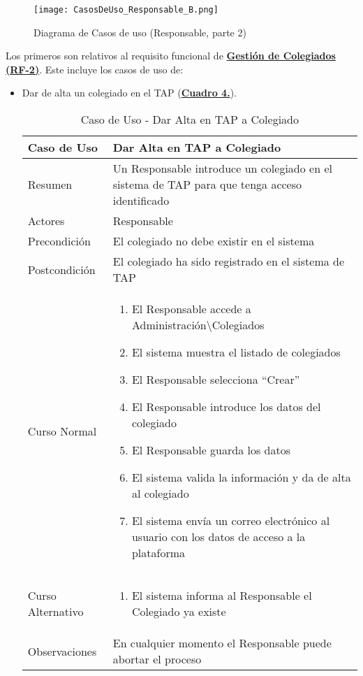 \begin{figure}[!htbp]
  \centering
  \texttt{[image: CasosDeUso\_Responsable\_B.png]}
  \caption{Diagrama de Casos de uso (Responsable, parte 2)}
  \label{fig:CasosDeUso_Responsable_B}
\end{figure}
\FloatBarrier


Los primeros son relativos al requisito funcional de \textbf{\hyperref[tab:rfGestColeg]{Gestión de Colegiados (RF-2)}}. Este incluye los casos de uso de:
\begin{itemize}
	\item \addtocounter{tabla}{1} Dar de alta un colegiado en el TAP (\textbf{\hyperref[tab:curColegAlta]{Cuadro 4.}}).
		\begin{table}[!htbp]
		  \centering  \addtocounter{casouso}{1}
		  \begin{tabular}{|l | p{100mm}|}
		    \textbf{Caso de Uso}  & \textbf{Dar Alta en TAP a Colegiado} \\ \hline
		    Resumen 		 & Un Responsable introduce un colegiado en el sistema de TAP para que tenga acceso identificado \\ \hline
		    Actores  		 & Responsable \\ \hline
		    Precondición  	 & El colegiado no debe existir en el sistema  \\ \hline
		    Postcondición  	 & El colegiado ha sido registrado en el sistema de TAP \\ \hline
		    Curso Normal   	 & \begin{enumerate}
			  \item El Responsable accede a Administración\textbackslash Colegiados
			  \item El sistema muestra el listado de colegiados
			  \item El Responsable selecciona ``Crear''
			  \item El Responsable introduce los datos del colegiado
			  \item El Responsable guarda los datos
			  \item El sistema valida la información y da de alta al colegiado
			  \item El sistema envía un correo electrónico al usuario con los datos de acceso a la plataforma
		    \end{enumerate}  \\ \hline
		    Curso Alternativo  & \begin{enumerate}
			  \item El sistema informa al Responsable el Colegiado ya existe
		    \end{enumerate}  \\ \hline
		    Observaciones 	 & En cualquier momento el Responsable puede abortar el proceso  \\ \hline
		  \end{tabular}
		  \caption{Caso de Uso  - Dar Alta en TAP a Colegiado}
		  \label{tab:curColegAlta}
		\end{table}
		\FloatBarrier
	

\end{itemize}
